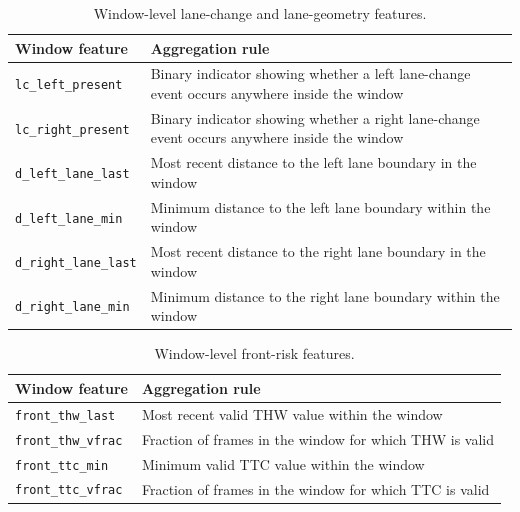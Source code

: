 \begin{table}[H]
    \centering
    \footnotesize
    \caption{Window-level lane-change and lane-geometry features.}
    \label{tab:appendix_lane_features}
    \begin{tabularx}{\textwidth}{@{}p{4.2cm}X@{}}
        \toprule
        \textbf{Window feature} & \textbf{Aggregation rule} \\
        \midrule
        \texttt{lc\_left\_present} & Binary indicator showing whether a left lane-change event occurs anywhere inside the window \\
        \texttt{lc\_right\_present} & Binary indicator showing whether a right lane-change event occurs anywhere inside the window \\
        \texttt{d\_left\_lane\_last} & Most recent distance to the left lane boundary in the window \\
        \texttt{d\_left\_lane\_min} & Minimum distance to the left lane boundary within the window \\
        \texttt{d\_right\_lane\_last} & Most recent distance to the right lane boundary in the window \\
        \texttt{d\_right\_lane\_min} & Minimum distance to the right lane boundary within the window \\
        \bottomrule
    \end{tabularx}
\end{table}

\begin{table}[H]
    \centering
    \footnotesize
    \caption{Window-level front-risk features.}
    \label{tab:appendix_risk_features}
    \begin{tabularx}{\textwidth}{@{}p{4.2cm}X@{}}
        \toprule
        \textbf{Window feature} & \textbf{Aggregation rule} \\
        \midrule
        \texttt{front\_thw\_last} & Most recent valid \ac{THW} value within the window \\
        \texttt{front\_thw\_vfrac} & Fraction of frames in the window for which \ac{THW} is valid \\
        \texttt{front\_ttc\_min} & Minimum valid \ac{TTC} value within the window \\
        \texttt{front\_ttc\_vfrac} & Fraction of frames in the window for which \ac{TTC} is valid \\
        \bottomrule
    \end{tabularx}
\end{table}

